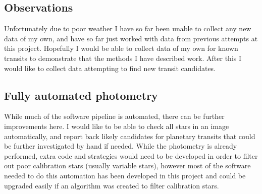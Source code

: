 
\subsection{Observations}

Unfortunately due to poor weather I have so far been unable to collect any new data of my own, and have so far just worked with data from previous attempts at this project. Hopefully I would be able to collect data of my own for known transits to demonstrate that the methods I have described work. After this I would like to collect data attempting to find new transit candidates.

\subsection{Fully automated photometry}

While much of the software pipeline is automated, there can be further improvements here. I would like to be able to check all stars in an image automatically, and report back likely candidates for planetary transits that could be further investigated by hand if needed. While the photometry is already performed, extra code and strategies would need to be developed in order to filter out poor calibration stars (usually variable stars), however most of the software needed to do this automation has been developed in this project and could be upgraded easily if an algorithm was created to filter calibration stars.